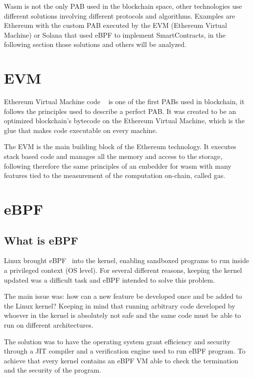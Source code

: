 Wasm is not the only PAB used in the blockchain space, other technologies use different solutions involving different protocols and algorithms. Examples are Ethereum with the custom PAB executed by the EVM (Ethereum Virtual Machine) or Solana that used eBPF to implement SmartContracts, in the following section those solutions and others will be analyzed.

\section{EVM}

Ethereum Virtual Machine code ~\cite{buterin2014next} is one of the first PABs used in blockchain, it follows the principles used to describe a perfect PAB. It was created to be an optimized blockchain's bytecode on the Ethereum Virtual Machine, which is the glue that makes code executable on every machine.

The EVM is the main building block of the Ethereum technology. It executes stack based code and manages all the memory and access to the storage, following therefore the same principles of an embedder for wasm with many features tied to the measurement of the computation on-chain, called gas.

\section{eBPF}

\subsection{What is eBPF}

Linux brought eBPF~\cite{ebpf} into the kernel, enabling sandboxed programs to run inside a privileged context (OS level). For several different reasons, keeping the kernel updated was a difficult task and eBPF intended to solve this problem.

The main issue was: how can a new feature be developed once and be added to the Linux kernel? Keeping in mind that running arbitrary code developed by whoever in the kernel is absolutely not safe and the same code must be able to run on different architectures.

The solution was to have the operating system grant efficiency and security through a JIT compiler and a verification engine used to run eBPF program. To achieve that every kernel contains an eBPF VM able to check the termination and the security of the program.

